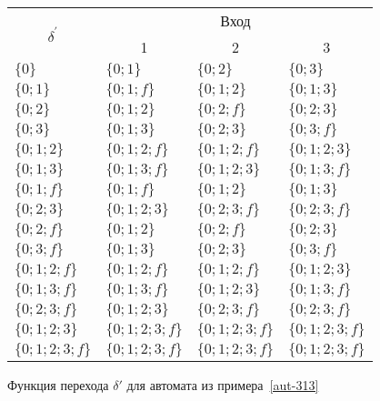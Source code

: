\begin{figure}
\centering
\begin{tabular}{llll}
\toprule
\multicolumn{1}{c}{\multirow{2}{*}{\Large $\delta^\prime$}}
	& \multicolumn{3}{c}{Вход} \\
\cmidrule(rl){2-4}
	& \multicolumn{1}{c}{1}
    & \multicolumn{1}{c}{2}
    & \multicolumn{1}{c}{3} \\
\midrule
$\{0\}$         & $\{0;1\}$       & $\{0;2\}$       & $\{0;3\}$       \\
$\{0;1\}$       & $\{0;1;f\}$     & $\{0;1;2\}$     & $\{0;1;3\}$     \\
$\{0;2\}$       & $\{0;1;2\}$     & $\{0;2;f\}$     & $\{0;2;3\}$     \\
$\{0;3\}$       & $\{0;1;3\}$     & $\{0;2;3\}$     & $\{0;3;f\}$     \\
$\{0;1;2\}$     & $\{0;1;2;f\}$   & $\{0;1;2;f\}$   & $\{0;1;2;3\}$   \\
$\{0;1;3\}$     & $\{0;1;3;f\}$   & $\{0;1;2;3\}$   & $\{0;1;3;f\}$   \\
$\{0;1;f\}$     & $\{0;1;f\}$     & $\{0;1;2\}$     & $\{0;1;3\}$     \\
$\{0;2;3\}$     & $\{0;1;2;3\}$   & $\{0;2;3;f\}$   & $\{0;2;3;f\}$   \\
$\{0;2;f\}$     & $\{0;1;2\}$     & $\{0;2;f\}$     & $\{0;2;3\}$     \\
$\{0;3;f\}$     & $\{0;1;3\}$     & $\{0;2;3\}$     & $\{0;3;f\}$     \\
$\{0;1;2;f\}$   & $\{0;1;2;f\}$   & $\{0;1;2;f\}$   & $\{0;1;2;3\}$   \\
$\{0;1;3;f\}$   & $\{0;1;3;f\}$   & $\{0;1;2;3\}$   & $\{0;1;3;f\}$   \\
$\{0;2;3;f\}$   & $\{0;1;2;3\}$   & $\{0;2;3;f\}$   & $\{0;2;3;f\}$   \\
$\{0;1;2;3\}$   & $\{0;1;2;3;f\}$ & $\{0;1;2;3;f\}$ & $\{0;1;2;3;f\}$ \\
$\{0;1;2;3;f\}$ & $\{0;1;2;3;f\}$ & $\{0;1;2;3;f\}$ & $\{0;1;2;3;f\}$ \\ \bottomrule
\end{tabular}
\caption{Функция перехода $\delta'$ для автомата из примера~\ref{aut-313}}\label{tab3}
\end{figure}
